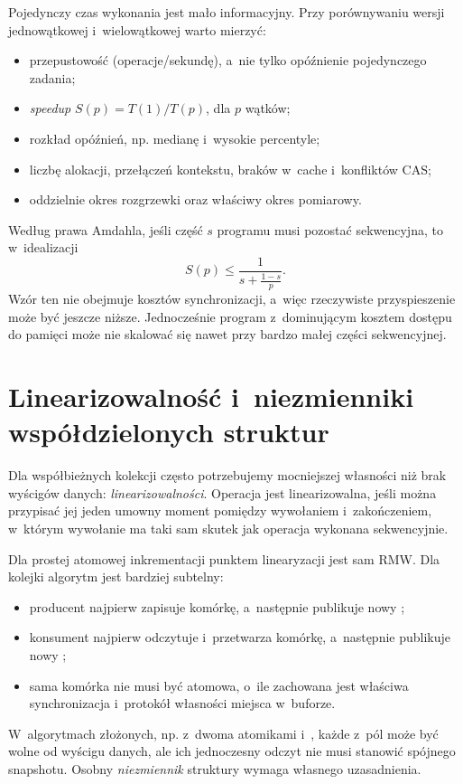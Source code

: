Pojedynczy czas wykonania jest mało informacyjny. Przy porównywaniu
wersji jednowątkowej i~wielowątkowej warto mierzyć:
\begin{itemize}
\item przepustowość (operacje/sekundę), a~nie tylko opóźnienie
      pojedynczego zadania;
\item \emph{speedup} \(S(p)=T(1)/T(p)\), dla \(p\) wątków;
\item rozkład opóźnień, np. medianę i~wysokie percentyle;
\item liczbę alokacji, przełączeń kontekstu, braków w~cache i~konfliktów CAS;
\item oddzielnie okres rozgrzewki oraz właściwy okres pomiarowy.
\end{itemize}

Według prawa Amdahla, jeśli część \(s\) programu musi pozostać
sekwencyjna, to w~idealizacji
\[
S(p)\leq\frac{1}{s+\frac{1-s}{p}}.
\]
Wzór ten nie obejmuje kosztów synchronizacji, a~więc rzeczywiste
przyspieszenie może być jeszcze niższe. Jednocześnie program
z~dominującym kosztem dostępu do pamięci może nie skalować się
nawet przy bardzo małej części sekwencyjnej.

\section{Linearizowalność i~niezmienniki współdzielonych struktur}
\label{sec:cpp16-linearizability}

Dla współbieżnych kolekcji często potrzebujemy mocniejszej własności
niż brak wyścigów danych: \emph{linearizowalności}.
Operacja jest linearizowalna, jeśli można przypisać jej jeden
umowny moment pomiędzy wywołaniem i~zakończeniem, w~którym
wywołanie ma taki sam skutek jak operacja wykonana sekwencyjnie.

Dla prostej atomowej inkrementacji punktem linearyzacji jest
sam RMW. Dla kolejki algorytm jest bardziej subtelny:
\begin{itemize}
\item producent najpierw zapisuje komórkę, a~następnie publikuje
      nowy ;
\item konsument najpierw odczytuje i~przetwarza komórkę, a~następnie
      publikuje nowy ;
\item sama komórka nie musi być atomowa, o~ile zachowana jest
      właściwa synchronizacja i~protokół własności miejsca w~buforze.
\end{itemize}

W~algorytmach złożonych, np. z~dwoma atomikami  i~,
każde z~pól może być wolne od wyścigu danych, ale ich jednoczesny
odczyt nie musi stanowić spójnego snapshotu. Osobny \emph{niezmiennik}
struktury wymaga własnego uzasadnienia.

